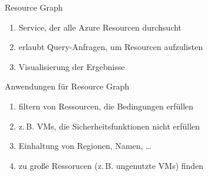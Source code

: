 
\begin{flashcard}[Definition]{Resource Graph}
  \begin{enumerate}
    \item Service, der alle Azure Resourcen durchsucht
    \item erlaubt Query-Anfragen, um Resourcen aufzulisten
    \item Visualisierung der Ergebnisse
  \end{enumerate}
\end{flashcard}

\begin{flashcard}[Definition]{Anwendungen für Resource Graph}
  \begin{enumerate}
    \item filtern von Ressourcen, die Bedingungen erfüllen
    \item z.\,B. VMs, die Sicherheitsfunktionen nicht erfüllen
    \item Einhaltung von Regionen, Namen, \ldots
    \item zu große Ressorucen (z.\,B. ungenutzte VMs) finden
  \end{enumerate}
\end{flashcard}
